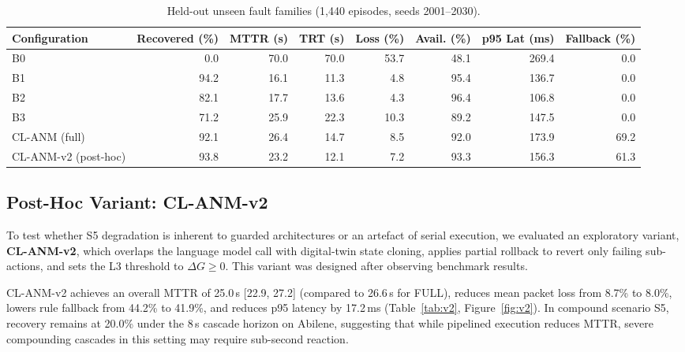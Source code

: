 \documentclass[sn-mathphys,Numbered]{sn-jnl}
\begin{document}
\begin{table}[t]\centering\footnotesize\setlength{\tabcolsep}{5pt}
\caption{Held-out unseen fault families (1,440 episodes, seeds 2001--2030).}\label{tab:unseen}%
\begin{adjustbox}{max width=\textwidth,center}
\begin{tabular}{lrrrrrrr}
\toprule
Configuration & Recovered (\%) & MTTR (s) & TRT (s) & Loss (\%) & Avail. (\%) & p95 Lat (ms) & Fallback (\%) \\
\midrule
B0 & 0.0 & 70.0 & 70.0 & 53.7 & 48.1 & 269.4 & 0.0 \\
B1 & 94.2 & 16.1 & 11.3 & 4.8 & 95.4 & 136.7 & 0.0 \\
B2 & 82.1 & 17.7 & 13.6 & 4.3 & 96.4 & 106.8 & 0.0 \\
B3 & 71.2 & 25.9 & 22.3 & 10.3 & 89.2 & 147.5 & 0.0 \\
CL-ANM (full) & 92.1 & 26.4 & 14.7 & 8.5 & 92.0 & 173.9 & 69.2 \\
CL-ANM-v2 (post-hoc) & 93.8 & 23.2 & 12.1 & 7.2 & 93.3 & 156.3 & 61.3 \\
\bottomrule
\end{tabular}
\end{adjustbox}
\end{table}

\subsection{Post-Hoc Variant: CL-ANM-v2}\label{sec:v2}
To test whether S5 degradation is inherent to guarded architectures or an artefact of serial execution, we evaluated an exploratory variant, \textbf{CL-ANM-v2}, which overlaps the language model call with digital-twin state cloning, applies partial rollback to revert only failing sub-actions, and sets the L3 threshold to $\Delta G\ge0$. This variant was designed after observing benchmark results.

CL-ANM-v2 achieves an overall MTTR of 25.0\,s [22.9, 27.2] (compared to 26.6\,s for FULL), reduces mean packet loss from 8.7\% to 8.0\%, lowers rule fallback from 44.2\% to 41.9\%, and reduces p95 latency by 17.2\,ms (Table~\ref{tab:v2}, Figure~\ref{fig:v2}). In compound scenario S5, recovery remains at 20.0\% under the 8\,s cascade horizon on Abilene, suggesting that while pipelined execution reduces MTTR, severe compounding cascades in this setting may require sub-second reaction.
\end{document}
